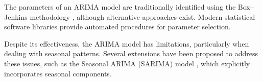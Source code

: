 \par
The parameters of an ARIMA model are traditionally identified using the Box--Jenkins methodology \cite{Shumway2017-kk}, although alternative approaches exist. Modern statistical software libraries provide automated procedures for parameter selection.

\par
Despite its effectiveness, the ARIMA model has limitations, particularly when dealing with seasonal patterns. Several extensions have been proposed to address these issues, such as the Seasonal ARIMA (SARIMA) model \cite{Valipour2015-sv}, which explicitly incorporates seasonal components.%










